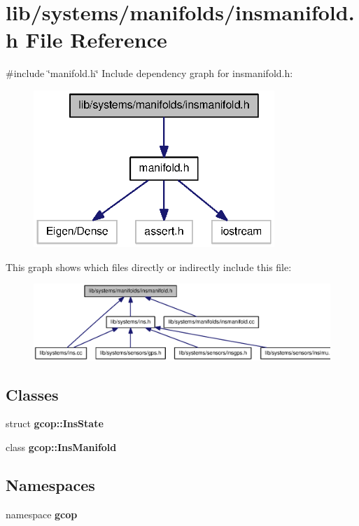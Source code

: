 \section{lib/systems/manifolds/insmanifold.h \-File \-Reference}
\label{insmanifold_8h}
{\ttfamily \#include \char`\"{}manifold.\-h\char`\"{}}\*
\-Include dependency graph for insmanifold.\-h\-:
\nopagebreak
\begin{figure}[H]
\begin{center}
\leavevmode
\includegraphics[width=258pt]{insmanifold_8h__incl}
\end{center}
\end{figure}
\-This graph shows which files directly or indirectly include this file\-:
\nopagebreak
\begin{figure}[H]
\begin{center}
\leavevmode
\includegraphics[width=350pt]{insmanifold_8h__dep__incl}
\end{center}
\end{figure}
\subsection*{\-Classes}
\begin{DoxyCompactItemize}
\item 
struct {\bf gcop\-::\-Ins\-State}
\item 
class {\bf gcop\-::\-Ins\-Manifold}
\end{DoxyCompactItemize}
\subsection*{\-Namespaces}
\begin{DoxyCompactItemize}
\item 
namespace {\bf gcop}
\end{DoxyCompactItemize}
